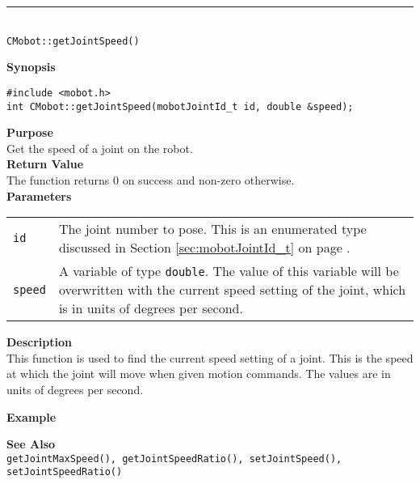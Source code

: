 \noindent
\vspace{5pt}
\rule{4.5in}{0.015in}\\
\noindent
{\LARGE \texttt{CMobot::getJointSpeed()}}\\
{}

\noindent
{\bf Synopsis}
\vspace{-8pt}
\begin{verbatim}
#include <mobot.h>
int CMobot::getJointSpeed(mobotJointId_t id, double &speed);
\end{verbatim}

\noindent
{\bf Purpose}\\
Get the speed of a joint on the robot.\\

\noindent
{\bf Return Value}\\
The function returns 0 on success and non-zero otherwise.\\

\noindent
{\bf Parameters}
\vspace{-0.1in}
\begin{description}
\item               
\begin{tabular}{p{10 mm}p{145 mm}}
\texttt{id} & The joint number to pose. This is an enumerated type 
discussed in Section \ref{sec:mobotJointId_t} on page
\pageref{sec:mobotJointId_t}.\\
\texttt{speed} & A variable of type \texttt{double}. The value of this variable
will be overwritten with the current speed setting of the joint, which is 
in units of degrees per second.
\end{tabular}
\end{description}

\noindent
{\bf Description}\\
This function is used to find the current speed setting of a joint.  This is
the speed at which the joint will move when given motion commands. The values
are in units of degrees per second.

\noindent
{\bf Example}\\
\noindent

\noindent
{\bf See Also}\\
\texttt{getJointMaxSpeed(), getJointSpeedRatio(), setJointSpeed(), setJointSpeedRatio()}

